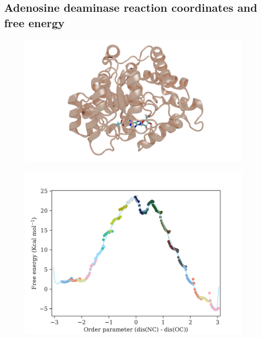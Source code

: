 \documentclass[journal=jpcbfk,manuscript=article,layout=traditional]{achemso}
\begin{document}
\subsection{Adenosine deaminase reaction coordinates and free energy}
\begin{figure}[ht!]
\centering
\includegraphics[scale=0.22]{./figures/ada-protein.png}
\end{figure}

\begin{figure}[ht!]
\centering
\includegraphics[scale=0.6]{./figures/ada-fenergy.pdf}
\end{figure}

\end{document}
